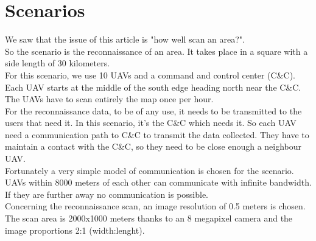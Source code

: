 \chapter{Scenarios}

We saw that the issue of this article is "how well scan an area?".\\

So the scenario is the reconnaissance of an area. It takes place in a square with a side length of 30 kilometers.\\
For this scenario, we use 10 UAVs and a command and control center (C\&C). Each UAV starts at the middle of the south edge heading north near the C\&C.
The UAVs have to scan entirely the map once per hour.\\

For the reconnaissance data, to be of any use, it needs to be transmitted to the users that need it. In this scenario, it's the C\&C which needs it. So each UAV need a communication path to C\&C to transmit the data collected. They have to maintain a contact with the C\&C, so they need to be close enough a neighbour UAV.\\
Fortunately a very simple model of communication is chosen for the scenario.  UAVs  within 8000  meters  of  each  other  can  communicate  with infinite  bandwidth.  If  they  are  further  away  no communication  is  possible.\\

Concerning the reconnaissance scan, an image resolution of 0.5 meters is chosen. The scan area is 2000x1000 meters thanks to an 8 megapixel camera and the image proportions 2:1 (width:lenght).

